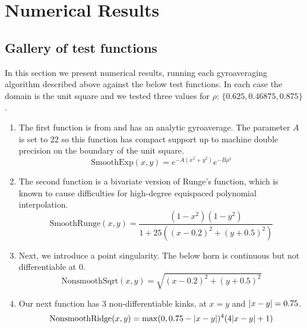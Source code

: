 \chapter{Numerical Results\label{chap:NumericalResults}}

\section{Gallery of test functions\label{sec:TestFunctions}}

In this section we present numerical results, running each gyroaveraging algorithm described above against the below test functions.  In each case the domain is the unit square and we tested three values for $\rho$: $\{0.625, 0.46875,0.875 \}  $.  \\
\begin{enumerate}
	\item The first function  is from \cite{guadagniThesis} and has an analytic gyroaverage. The parameter $A$ is set to $22$ so this function has compact support up to machine double precision on the boundary of the unit square.
	\[  \text{SmoothExp}(x,y) = e^{-A(x^2+y^2)} e^{-B\rho^2}\]
	\item The second function is a bivariate version of Runge's function, which is known to cause difficulties for high-degree equispaced polynomial interpolation.
	\[ \text{SmoothRunge}(x,y) = \frac{(1-x^2)(1-y^2) }{1 + 25(   (x-0.2)^2 + (y+0.5)^2)} \]  
	\item Next, we introduce a point singularity.  The below horn is continuous but not differentiable at 0.
	\[  \text{NonsmoothSqrt}(x,y) = \sqrt{(x-0.2)^2 + (y+0.5)^2} \]
	\item Our next function has 3 non-differentiable kinks, at $x=y$ and $\abs{x-y} = 0.75$.
	\[  \text{NonsmoothRidge}(x,y) = \max(0,0.75-\abs{x-y})^4(4\abs{x-y}+1) \]
\end{enumerate}



